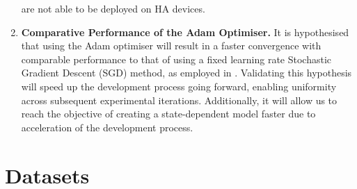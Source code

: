 \documentclass[logo,bsc,singlespacing,parskip,online]{infthesis}
\begin{document}
\begin{enumerate}
   are not able to be deployed on HA devices.
   \item \textbf{Comparative Performance of the Adam Optimiser.}
   It is hypothesised that using the Adam optimiser will result in a faster convergence with comparable performance to that of using a fixed learning rate Stochastic Gradient Descent (SGD) method, as employed in \citet{Huwel2020HearDS}.
   Validating this hypothesis will speed up the development process going forward, 
   enabling uniformity across subsequent experimental iterations. Additionally,
   it will allow us to reach the objective of creating a state-dependent model faster due to acceleration of the development process.
\end{enumerate}

\section{Datasets}
\label{sec:datasets}

\end{document}

